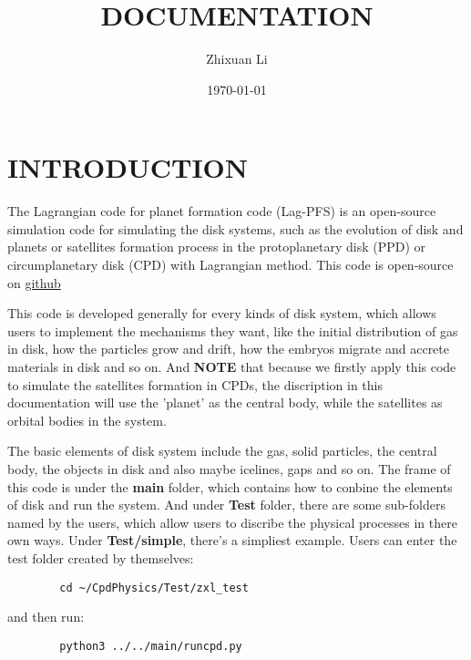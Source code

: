 \documentclass[12pt]{article}
\title{\textbf{DOCUMENTATION}}
\author{Zhixuan Li}
\date{\today}
\begin{document}
\maketitle 

\section{INTRODUCTION}
The Lagrangian code for planet formation code (Lag-PFS) is an open-source simulation 
code for simulating the disk systems, such as the evolution of disk and  
planets or satellites formation process in the protoplanetary disk (PPD) or 
circumplanetary disk (CPD) with Lagrangian method. This code is open-source on 
\href{https://github.com/Judithlll/CpdPhysics}{github}

This code is developed generally for every kinds of disk system, which allows 
users to implement the mechanisms they want, like the initial distribution 
of gas in disk, how the particles grow and drift, how the embryos 
migrate and accrete materials in disk and so on. And \textbf{NOTE} that because 
we firstly apply this code to simulate the satellites formation in CPDs, the 
discription in this documentation will use the 'planet' as the central body, while 
the satellites as orbital bodies in the system. 

The basic elements of disk system include the gas, solid particles, the central 
body, the objects in disk and also maybe icelines, gaps and so on.
The frame of this code is under the \textbf{main} folder, which contains 
how to conbine the elements of disk and run the system. And under 
\textbf{Test} folder, there are some sub-folders named by the users, which 
allow users to discribe the physical processes in there own ways. Under 
\textbf{Test/simple}, there's a simpliest example. Users can enter the 
test folder created by themselves:
\begin{listing}[h]
    \label{code:a}
    \begin{verbatim}
        cd ~/CpdPhysics/Test/zxl_test
    \end{verbatim}
\end{listing}

\noindent and then run:
\begin{listing}[htb]
    \label{code:b}
    \begin{verbatim}
        python3 ../../main/runcpd.py 
    \end{verbatim}
\end{listing}
\end{document}
